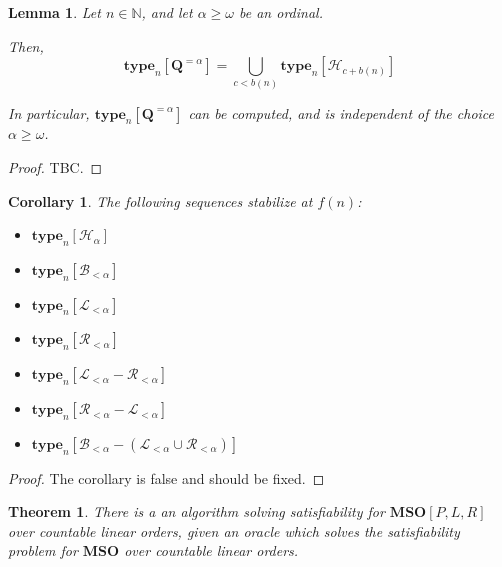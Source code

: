 \documentclass{article}
\newtheorem{theorem}{Theorem}
\newtheorem{corollary}{Corollary}
\newtheorem{lemma}{Lemma}
\newcommand{\brackets}[1]{\left[ {#1} \right]}
\newcommand{\mso}{\mathbf{MSO}}
\newcommand{\qq}{\mathbf{Q}}
\newcommand{\NN}{\mathbb{N}}
\newcommand{\type}[2]{\mathbf{type}_{#1} \brackets{#2}}
\begin{document}
\begin{lemma}
  Let $n \in \NN$, and let $\alpha \ge \omega$ be an ordinal.

  Then,
  $$\type{n}{\qq^{= \alpha}} = \bigcup_{c < b(n)}{\type{n}{\mathcal{H}_{c + b(n)}}}$$

  In particular, $\type{n}{\qq^{= \alpha}}$ can be
  computed, and is independent of the choice $\alpha \ge \omega$.
\end{lemma}

\begin{proof}
  TBC.
\end{proof}

\begin{corollary}
  The following sequences stabilize at $f(n)$:

  \begin{itemize}
    \item $\type{n}{\mathcal{H}_{\alpha}}$
    \item $\type{n}{\mathcal{B}_{< \alpha}}$
    \item $\type{n}{\mathcal{L}_{< \alpha}}$
    \item $\type{n}{\mathcal{R}_{< \alpha}}$
    \item $\type{n}{\mathcal{L}_{< \alpha} - \mathcal{R}_{< \alpha}}$
    \item $\type{n}{\mathcal{R}_{< \alpha} - \mathcal{L}_{< \alpha}}$
    \item $\type{n}{\mathcal{B}_{< \alpha} - (\mathcal{L}_{< \alpha} \cup \mathcal{R}_{< \alpha})}$
  \end{itemize}
\end{corollary}

\begin{proof}
  The corollary is false and should be fixed.
\end{proof}

\begin{theorem}
  There is a an algorithm solving satisfiability for $\mso[P, L, R]$ over countable linear orders,
  given an oracle which solves the satisfiability problem for $\mso$ over countable linear orders.
\end{theorem}
\end{document}
